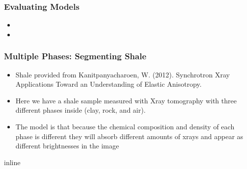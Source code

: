 \documentclass[letterpaper,10pt,english]{sphinxmanual}
\begin{document}
\noindent{}


\subsubsection{Evaluating Models}
\label{\detokenize{04-BasicSegmentation_Part2:evaluating-models}}\begin{itemize}
\item {} 
\sphinxAtStartPar
{}

\item {} 
\sphinxAtStartPar
{}

\end{itemize}


\subsubsection{Multiple Phases: Segmenting Shale}
\label{\detokenize{04-BasicSegmentation_Part2:multiple-phases-segmenting-shale}}\begin{itemize}
\item {} 
\sphinxAtStartPar
Shale provided from Kanitpanyacharoen, W. (2012). Synchrotron X\sphinxhyphen{}ray Applications Toward an Understanding of Elastic Anisotropy.

\item {} 
\sphinxAtStartPar
Here we have a shale sample measured with X\sphinxhyphen{}ray tomography with three different phases inside (clay, rock, and air).

\item {} 
\sphinxAtStartPar
The model is that because the chemical composition and density of each phase is different they will absorb different amounts of x\sphinxhyphen{}rays and appear as different brightnesses in the image

\end{itemize}

\begin{sphinxVerbatim}[commandchars=\\\{\}]
   
   
   
   
 inline
  
     
 
\end{sphinxVerbatim}
\end{document}
